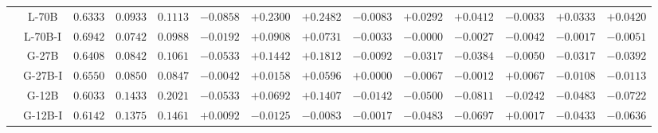 \begin{table}[]
{\begin{tabular}{|c|c|ccc|ccc|ccc|ccc|}
\cline{2-14}
 & L-70B & $0.6333$ & $0.0933$ & $0.1113$ & $-0.0858$ & $+0.2300$ & $+0.2482$ & $-0.0083$ & $+0.0292$ & $+0.0412$ & $-0.0033$ & $+0.0333$ & $+0.0420$ \\
\cline{2-14}
 & L-70B-I & $0.6942$ & $0.0742$ & $0.0988$ & $-0.0192$ & $+0.0908$ & $+0.0731$ & $-0.0033$ & $-0.0000$ & $-0.0027$ & $-0.0042$ & $-0.0017$ & $-0.0051$ \\
\cline{2-14}
 & G-27B & $0.6408$ & $0.0842$ & $0.1061$ & $-0.0533$ & $+0.1442$ & $+0.1812$ & $-0.0092$ & $-0.0317$ & $-0.0384$ & $-0.0050$ & $-0.0317$ & $-0.0392$ \\
\cline{2-14}
 & G-27B-I & $0.6550$ & $0.0850$ & $0.0847$ & $-0.0042$ & $+0.0158$ & $+0.0596$ & $+0.0000$ & $-0.0067$ & $-0.0012$ & $+0.0067$ & $-0.0108$ & $-0.0113$ \\
\cline{2-14}
 & G-12B & $0.6033$ & $0.1433$ & $0.2021$ & $-0.0533$ & $+0.0692$ & $+0.1407$ & $-0.0142$ & $-0.0500$ & $-0.0811$ & $-0.0242$ & $-0.0483$ & $-0.0722$ \\
\cline{2-14}
 & G-12B-I & $0.6142$ & $0.1375$ & $0.1461$ & $+0.0092$ & $-0.0125$ & $-0.0083$ & $-0.0017$ & $-0.0483$ & $-0.0697$ & $+0.0017$ & $-0.0433$ & $-0.0636$ \\
\hline
\end{tabular}
}%
\end{table}
